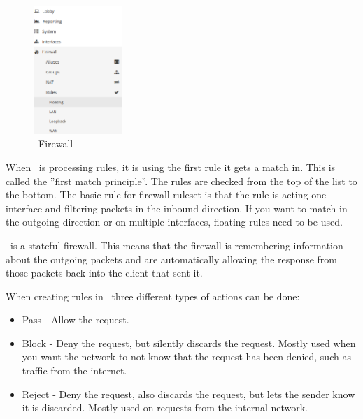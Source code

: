 \begin{figure}[h!]
    \centering
    \includegraphics[width=0.3\textwidth]{Images/firewall/firewall_rules.PNG}
    \caption{\opnsense\ Firewall }
    \label{opnsense:firewall_rules}
\end{figure}

When \opnsense\ is processing rules, it is using the first rule it gets a match in. This is called the ''first match principle''. The rules are checked from the top of the list to the bottom. The basic rule for firewall ruleset is that the rule is acting one interface and filtering packets in the inbound direction. If you want to match in the outgoing direction or on multiple interfaces, floating rules need to be used.

\opnsense\ is a stateful firewall. This means that the firewall is remembering information about the outgoing packets and are automatically allowing the response from those packets back into the client that sent it.


When creating rules in \opnsense\ three different types of actions can be done:
\begin{itemize}
    \item Pass - Allow the request.
    \item Block - Deny the request, but silently discards the request. Mostly used when you want the network to not know that the request has been denied, such as traffic from the internet.
    \item Reject - Deny the request, also discards the request, but lets the sender know it is discarded. Mostly used on requests from the internal network.
\end{itemize}


